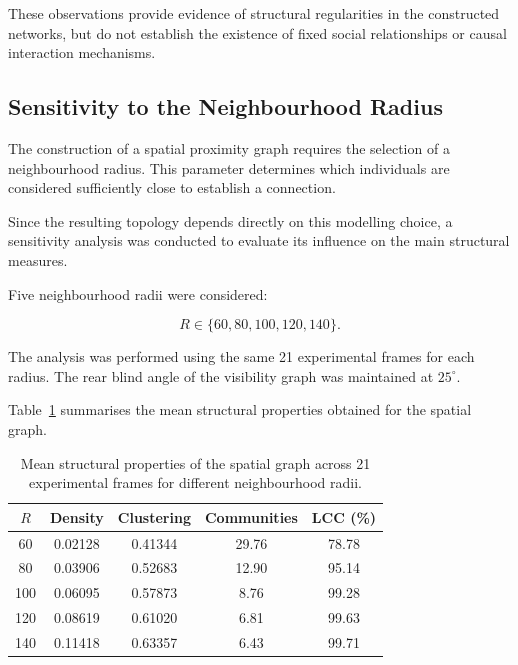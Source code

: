 \documentclass[10pt,a4paper]{article}
\begin{document}
These observations provide evidence
of structural regularities in the
constructed networks, but do not
establish the existence of fixed
social relationships or causal
interaction mechanisms.

\FloatBarrier


\subsection{Sensitivity to the Neighbourhood Radius}
\label{subsec:radius_sensitivity}

The construction of a spatial proximity graph
requires the selection of a neighbourhood
radius. This parameter determines which
individuals are considered sufficiently
close to establish a connection.

Since the resulting topology depends
directly on this modelling choice,
a sensitivity analysis was conducted
to evaluate its influence on the
main structural measures.

Five neighbourhood radii were considered:

\begin{equation}
R \in \{60,80,100,120,140\}.
\end{equation}

The analysis was performed using the same
21 experimental frames for each radius.
The rear blind angle of the visibility
graph was maintained at $25^\circ$.

Table~\ref{tab:sensitivity_results}
summarises the mean structural properties
obtained for the spatial graph.

\begin{table}[htbp]
    \centering

    \caption{Mean structural properties
    of the spatial graph across
    21 experimental frames for
    different neighbourhood radii.}

    \label{tab:sensitivity_results}

    \small
    \begin{tabular}{ccccc}
        \hline
        $R$ & Density & Clustering
        & Communities & LCC (\%)\\
        \hline
        60  & 0.02128 & 0.41344 & 29.76 & 78.78\\
        80  & 0.03906 & 0.52683 & 12.90 & 95.14\\
        100 & 0.06095 & 0.57873 & 8.76  & 99.28\\
        120 & 0.08619 & 0.61020 & 6.81  & 99.63\\
        140 & 0.11418 & 0.63357 & 6.43  & 99.71\\
        \hline
    \end{tabular}
\end{table}
\end{document}
